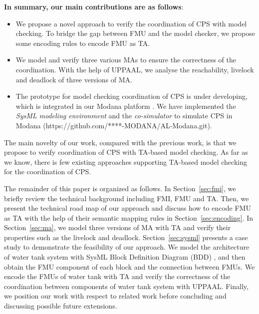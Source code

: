 \textbf{In summary, our main contributions are as follows}:
\begin{itemize}
\item
We propose a novel approach to verify the coordination of CPS with model checking. To bridge the gap between FMU and the model checker, we propose some encoding rules to encode FMU as TA.
\item
We model and verify three various MAs to ensure the correctness of the coordination. With the help of UPPAAL, we analyse the reachability, livelock and deadlock of three versions of MA.
\item
The prototype for model checking coordination of CPS is under developing, which is integrated in our Modana platform \cite{Cheng2015Modana}. We have implemented the \textit{SysML modeling environment} and the \textit{co-simulator} to simulate CPS in Modana (https://github.com/****-MODANA/AL-Modana.git).
\end{itemize}
The main novelty of our work, compared with the previous work, is that we propose to verify coordination of CPS with TA-based model checking. As far as we know, there is few existing approaches supporting TA-based model checking for the coordination of CPS.

The remainder of this paper is organized as follows. In Section~\ref{sec:fmi}, we briefly review the technical background including FMI, FMU and TA. Then, we present the technical road map of our approach and discuss how to encode FMU as TA with the help of their semantic mapping rules in Section~\ref{sec:encoding}. In Section~\ref{sec:ma}, we model three versions of MA with TA and verify their properties such as the livelock and deadlock. Section~\ref{sec:sysml} presents a case study to demonstrate the feasibility of our approach. We model the architecture of water tank system with SysML Block Definition Diagram (BDD) \cite{SemerathBHSV17}, and then obtain the FMU component of each block and the connection between FMUs. We encode the FMUs of water tank with TA and verify the correctness of the coordination between components of water tank system with UPPAAL. Finally, we position our work with respect to related work before concluding and discussing possible future extensions.




















